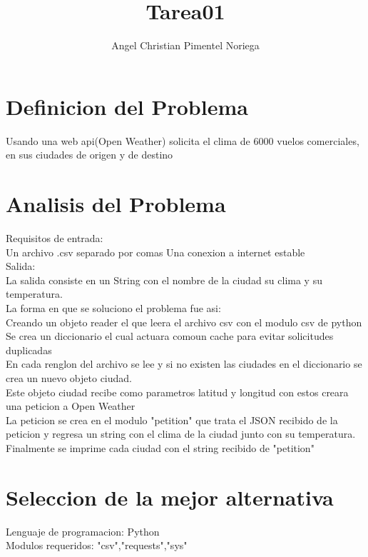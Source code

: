 \documentclass{article}
\title{Tarea01}
\author{Angel Christian Pimentel Noriega}
\begin{document}
\maketitle

\section{Definicion del Problema}
Usando una web api(Open Weather) solicita el clima de 6000 vuelos comerciales, en sus ciudades de origen y de destino

\section{Analisis del Problema}
Requisitos de entrada:\\
Un archivo .csv separado por comas
  Una conexion a internet estable
\\Salida:\\
La salida consiste en un String con el nombre de la ciudad su clima y su temperatura.\\
La forma en que se soluciono el problema fue asi:\\
Creando un objeto reader el que leera el archivo csv con el modulo csv de python\\
Se crea un diccionario el cual actuara comoun cache para evitar solicitudes duplicadas\\
En cada renglon del archivo se lee y si no existen las ciudades en el diccionario se crea un nuevo
objeto ciudad.\\
Este objeto ciudad recibe como parametros latitud y longitud con estos creara una peticion a Open Weather\\
La peticion se crea en el modulo "petition" que trata el JSON recibido de la peticion y regresa un string con 
el clima de la ciudad junto con su temperatura.\\
Finalmente se imprime cada ciudad con el string recibido de "petition"
\section{Seleccion de la mejor alternativa}
Lenguaje de programacion: Python\\
Modulos requeridos: "csv","requests","sys"
\end{document}
